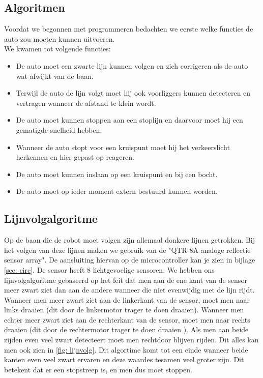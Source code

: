 \documentclass[a4paper,twoside,kulak]{kulakreport}
\begin{document}
	\subsection{Algoritmen}
	Voordat we begonnen met programmeren bedachten we eerste welke functies de auto zou moeten kunnen uitvoeren.\\
	We kwamen tot volgende functies:
	\begin{itemize}\item De auto moet een zwarte lijn kunnen volgen en zich corrigeren als de auto wat afwijkt van de baan.
		\item Terwijl de auto de lijn volgt moet hij ook voorliggers kunnen detecteren en vertragen wanneer de afstand te klein wordt.
		\item De auto moet kunnen stoppen aan een stoplijn en daarvoor moet hij een gematigde snelheid hebben.
		\item Wanneer de auto stopt voor een kruispunt moet hij het verkeerslicht herkennen en hier gepast op reageren.
		\item De auto moet kunnen inslaan op een kruispunt en bij een bocht.
		\item De auto moet op ieder moment extern bestuurd kunnen worden.\end{itemize}
	
	
	\subsection{Lijnvolgalgoritme}
	Op de baan die de robot moet volgen zijn allemaal donkere lijnen getrokken. Bij het volgen van deze lijnen maken we gebruik van de "QTR-8A analoge reflectie sensor array".
	De aansluiting hiervan op de microcontroller kan je zien in bijlage \ref{sec: circ}. De sensor heeft 8 lichtgevoelige sensoren. We hebben ons lijnvolgalgoritme gebaseerd op het feit dat men aan de ene kant van de sensor meer zwart ziet dan aan de andere wanneer die niet evenwijdig met de lijn rijdt. Wanneer men meer zwart ziet aan de linkerkant van de sensor, moet men naar links draaien (dit door de linkermotor trager te doen draaien). Wanneer men echter meer zwart ziet aan de rechterkant van de sensor, moet men naar rechts draaien (dit door de rechtermotor trager te doen draaien ). Als men aan beide zijden even veel zwart detecteert moet men rechtdoor blijven rijden. Dit alles kan men ook zien in  \ref{fig: lijnvolg}. Dit algortime komt tot een einde wanneer beide kanten even veel zwart ervaren en deze waardes tesamen veel groter zijn. Dit betekent dat er een stopstreep is, en men dus moet stoppen. 
	
\end{document}

